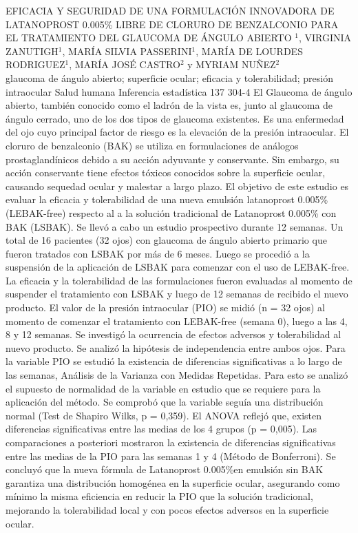 \A
{EFICACIA Y SEGURIDAD DE UNA FORMULACIÓN INNOVADORA DE LATANOPROST 0.005\% LIBRE DE CLORURO DE BENZALCONIO PARA EL TRATAMIENTO DEL GLAUCOMA DE ÁNGULO ABIERTO}
{$^1$, VIRGINIA ZANUTIGH$^1$, MARÍA SILVIA PASSERINI$^1$, MARÍA DE LOURDES RODRIGUEZ$^1$, MARÍA JOSÉ CASTRO$^2$ y MYRIAM NUÑEZ$^2$}
{
\\}
{glaucoma de ángulo abierto; superficie ocular; eficacia y tolerabilidad; presión intraocular} 
 {Salud humana} 
 {Inferencia estadística} 
 {137} 
 {304-4}
{El Glaucoma de ángulo abierto, también conocido como el ladrón de la vista es, junto al glaucoma de ángulo cerrado, uno de los dos tipos de glaucoma existentes. Es una enfermedad del ojo cuyo principal factor de riesgo es la elevación de la presión intraocular. El cloruro de benzalconio (BAK) se utiliza en formulaciones de análogos prostaglandínicos debido a su acción adyuvante y conservante. Sin embargo, su acción conservante tiene efectos tóxicos conocidos sobre la superficie ocular, causando sequedad ocular y malestar a largo plazo. El objetivo de este estudio es evaluar la eficacia y tolerabilidad de una nueva emulsión latanoprost 0.005\% (LEBAK-free) respecto al a la solución tradicional de Latanoprost 0.005\% con BAK (LSBAK). Se llevó a cabo un estudio prospectivo durante 12 semanas. Un total de 16 pacientes (32 ojos) con glaucoma de ángulo abierto primario que fueron tratados con LSBAK por más de 6 meses. Luego se procedió a la suspensión de la aplicación de LSBAK para comenzar con el uso de LEBAK-free. La eficacia y la tolerabilidad de las formulaciones fueron evaluadas al momento de suspender el tratamiento con LSBAK y luego de 12 semanas de recibido el nuevo producto. El valor de la presión intraocular (PIO) se midió (n = 32 ojos) al momento de comenzar el tratamiento con LEBAK-free (semana 0), luego a las 4, 8 y 12 semanas. Se investigó la ocurrencia de efectos adversos y tolerabilidad al nuevo producto. Se analizó la hipótesis de independencia entre ambos ojos. Para la variable PIO se estudió la existencia de diferencias significativas a lo largo de las semanas, Análisis de la Varianza con Medidas Repetidas. Para esto se analizó el supuesto de normalidad de la variable en estudio que se requiere para la aplicación del método. Se comprobó que la variable seguía una distribución normal (Test de Shapiro Wilks, p = 0,359). El ANOVA reflejó que, existen diferencias significativas entre las medias de los 4 grupos (p = 0,005). Las comparaciones a posteriori mostraron la existencia de diferencias significativas entre las medias de la PIO para las semanas 1 y 4 (Método de Bonferroni). Se concluyó que la nueva fórmula de Latanoprost 0.005\%en emulsión sin BAK garantiza una distribución homogénea en la superficie ocular, asegurando como mínimo la misma eficiencia en reducir la PIO que la solución tradicional, mejorando la tolerabilidad local y con pocos efectos adversos en la superficie ocular.}
